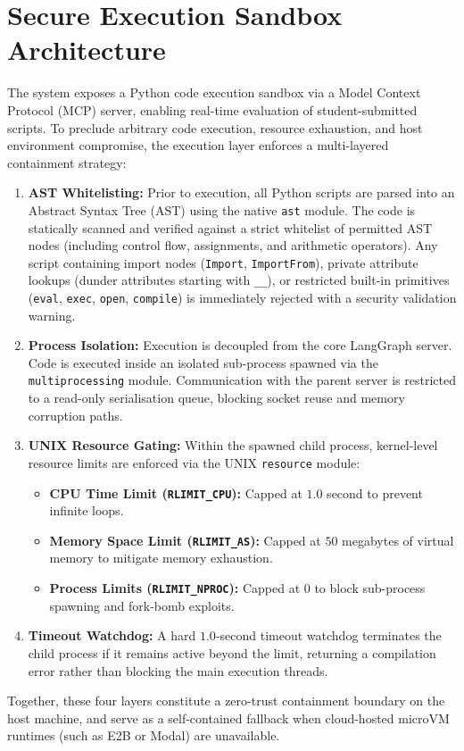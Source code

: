 \documentclass[11pt,a4paper]{report}
\begin{document}
\section{Secure Execution Sandbox Architecture}
The system exposes a Python code execution sandbox via a Model Context Protocol (MCP) server, enabling real-time evaluation of student-submitted scripts. To preclude arbitrary code execution, resource exhaustion, and host environment compromise, the execution layer enforces a multi-layered containment strategy:
\begin{enumerate}
    \item \textbf{AST Whitelisting:} Prior to execution, all Python scripts are parsed into an Abstract Syntax Tree (AST) using the native \texttt{ast} module. The code is statically scanned and verified against a strict whitelist of permitted AST nodes (including control flow, assignments, and arithmetic operators). Any script containing import nodes (\texttt{Import}, \texttt{ImportFrom}), private attribute lookups (dunder attributes starting with \texttt{\_\_}), or restricted built-in primitives (\texttt{eval}, \texttt{exec}, \texttt{open}, \texttt{compile}) is immediately rejected with a security validation warning.
    \item \textbf{Process Isolation:} Execution is decoupled from the core LangGraph server. Code is executed inside an isolated sub-process spawned via the \texttt{multiprocessing} module. Communication with the parent server is restricted to a read-only serialisation queue, blocking socket reuse and memory corruption paths.
    \item \textbf{UNIX Resource Gating:} Within the spawned child process, kernel-level resource limits are enforced via the UNIX \texttt{resource} module:
    \begin{itemize}
        \item \textbf{CPU Time Limit (\texttt{RLIMIT\_CPU}):} Capped at $1.0$ second to prevent infinite loops.
        \item \textbf{Memory Space Limit (\texttt{RLIMIT\_AS}):} Capped at $50$ megabytes of virtual memory to mitigate memory exhaustion.
        \item \textbf{Process Limits (\texttt{RLIMIT\_NPROC}):} Capped at $0$ to block sub-process spawning and fork-bomb exploits.
    \end{itemize}
    \item \textbf{Timeout Watchdog:} A hard $1.0$-second timeout watchdog terminates the child process if it remains active beyond the limit, returning a compilation error rather than blocking the main execution threads.
\end{enumerate}
Together, these four layers constitute a zero-trust containment boundary on the host machine, and serve as a self-contained fallback when cloud-hosted microVM runtimes (such as E2B or Modal) are unavailable.
\end{document}
